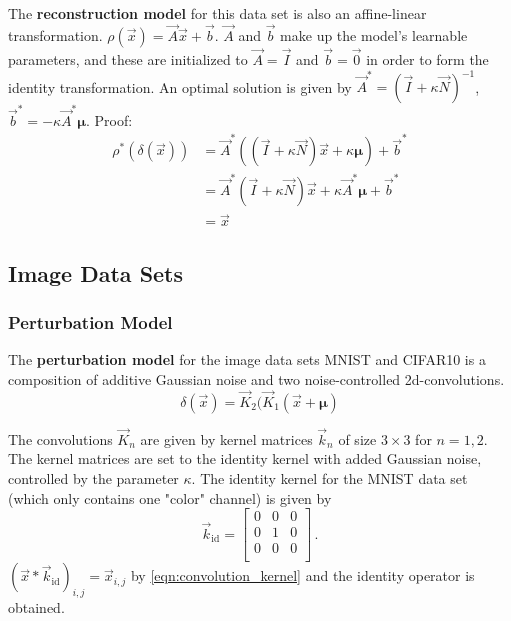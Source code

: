 The \textbf{reconstruction model} for this data set is also an affine-linear transformation. 
$\rho(\vec x) = \vec A \vec x + \vec b$.
$\vec A$ and $\vec b$ make up the model's learnable parameters, and
these are initialized to $\vec A = \vec I$ and $\vec b = \vec 0$ in order to form the identity transformation.
An optimal solution is given by
$\vec A^* = (\vec I + \kappa \vec N)^{-1}$, $\vec b^* = -\kappa \vec A^* \boldsymbol \mu$.
Proof:
\begin{equation}
\label{eqn:gmm_optimal}
\begin{split}
    \rho^* ( \delta (\vec x)) 
    &= \vec A^* ((\vec I + \kappa \vec N)\vec x + \kappa \boldsymbol \mu) + \vec b^* \\
    &= \vec A^* (\vec I + \kappa \vec N)\vec x + \kappa \vec A^* \boldsymbol \mu + \vec b^* \\
    &= \vec x
\end{split}
\end{equation}

\subsection{Image Data Sets}

\subsubsection{Perturbation Model}

The \textbf{perturbation model} for the image data sets MNIST and CIFAR10
is a composition of additive Gaussian noise and two noise-controlled 2d-convolutions.
\[
    \delta(\vec x) = \vec K_2(\vec K_1(\vec x + \boldsymbol \mu)
\]

The convolutions $\vec K_n$ are given by kernel matrices $\vec k_n$ of size $3\times3$ for $n=1,2$.
The kernel matrices are set to the identity kernel with added Gaussian noise, 
controlled by the parameter $\kappa$.
The identity kernel for the MNIST data set (which only contains one "color" channel) is given by 
\begin{equation*}
    \vec k_{\text{id}} = \begin{bmatrix}
        0 & 0 & 0 \\
        0 & 1 & 0 \\
        0 & 0 & 0 \\
    \end{bmatrix} \,.
\end{equation*}
%
$(\vec x * \vec k_\text{id})_{i,j} = \vec x_{i, j}$
by \cref{eqn:convolution_kernel}
and the identity operator is obtained.

